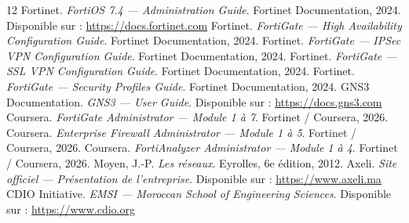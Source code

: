 \begin{thebibliography}{12}
     Fortinet. \textit{FortiOS 7.4 --- Administration Guide}. Fortinet Documentation, 2024. Disponible sur : \url{https://docs.fortinet.com}
     Fortinet. \textit{FortiGate --- High Availability Configuration Guide}. Fortinet Documentation, 2024.
     Fortinet. \textit{FortiGate --- IPSec VPN Configuration Guide}. Fortinet Documentation, 2024.
     Fortinet. \textit{FortiGate --- SSL VPN Configuration Guide}. Fortinet Documentation, 2024.
     Fortinet. \textit{FortiGate --- Security Profiles Guide}. Fortinet Documentation, 2024.
     GNS3 Documentation. \textit{GNS3 --- User Guide}. Disponible sur : \url{https://docs.gns3.com}
     Coursera. \textit{FortiGate Administrator --- Module 1 à 7}. Fortinet / Coursera, 2026.
     Coursera. \textit{Enterprise Firewall Administrator --- Module 1 à 5}. Fortinet / Coursera, 2026.
     Coursera. \textit{FortiAnalyzer Administrator --- Module 1 à 4}. Fortinet / Coursera, 2026.
     Moyen, J.-P. \textit{Les réseaux}. Eyrolles, 6e édition, 2012.
     Axeli. \textit{Site officiel --- Présentation de l'entreprise}. Disponible sur : \url{https://www.axeli.ma}
     CDIO Initiative. \textit{EMSI --- Moroccan School of Engineering Sciences}. Disponible sur : \url{https://www.cdio.org}
\end{thebibliography}
